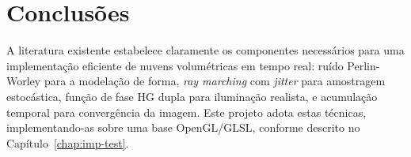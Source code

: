 \section{Conclusões}
\label{chap2:sec:concs}

A literatura existente estabelece claramente os componentes necessários para uma implementação eficiente de nuvens volumétricas em tempo real: ruído Perlin-Worley para a modelação de forma, \emph{ray marching} com \emph{jitter} para amostragem estocástica, função de fase HG dupla para iluminação realista, e acumulação temporal para convergência da imagem. Este projeto adota estas técnicas, implementando-as sobre uma base \ac{OpenGL}/GLSL, conforme descrito no Capítulo~\ref{chap:imp-test}.
